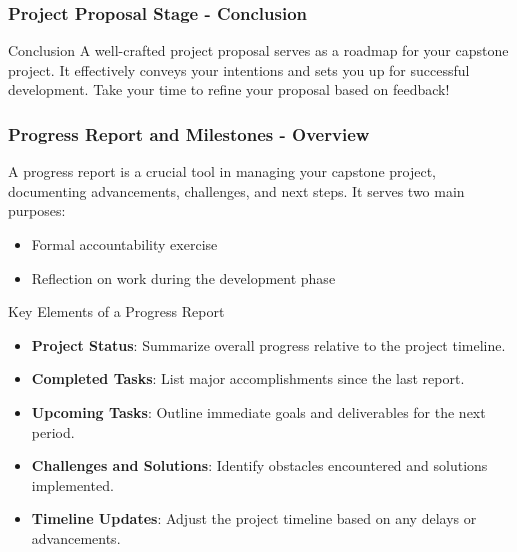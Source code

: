 \documentclass{beamer}
\begin{document}
\begin{frame}[fragile]
    \frametitle{Project Proposal Stage - Conclusion}
    \begin{block}{Conclusion}
        A well-crafted project proposal serves as a roadmap for your capstone project. It effectively conveys your intentions and sets you up for successful development. 
        Take your time to refine your proposal based on feedback!
    \end{block}
\end{frame}

\begin{frame}[fragile]
    \frametitle{Progress Report and Milestones - Overview}
    A progress report is a crucial tool in managing your capstone project, documenting advancements, challenges, and next steps. It serves two main purposes: 
    \begin{itemize}
        \item Formal accountability exercise
        \item Reflection on work during the development phase
    \end{itemize}
    
    \begin{block}{Key Elements of a Progress Report}
        \begin{itemize}
            \item \textbf{Project Status}: Summarize overall progress relative to the project timeline.
            \item \textbf{Completed Tasks}: List major accomplishments since the last report.
            \item \textbf{Upcoming Tasks}: Outline immediate goals and deliverables for the next period.
            \item \textbf{Challenges and Solutions}: Identify obstacles encountered and solutions implemented.
            \item \textbf{Timeline Updates}: Adjust the project timeline based on any delays or advancements.
        \end{itemize}
    \end{block}
\end{frame}
\end{document}
